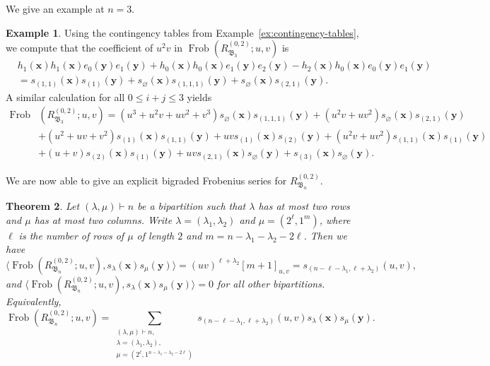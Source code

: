 \documentclass[12pt]{amsart}
\theoremstyle{plain}
\newtheorem{theorem}{Theorem}[section]
\theoremstyle{definition}
\newtheorem{example}[theorem]{Example}
\DeclareMathOperator{\Frob}{Frob}
\newcommand{\x}{\mathbf{x}}
\newcommand{\y}{\mathbf{y}}
\begin{document}
We give an example at $n=3$.
\begin{example}\label{ex:n3-frobenius}
    Using the contingency tables from Example~\ref{ex:contingency-tables}, we compute that the coefficient of $ u^2 v $ in $\Frob(R_{\mathfrak{B}_3}^{(0,2)}; u, v)$ is
    \begin{equation}
\begin{aligned}
        &h_1(\x)h_1(\x)e_0(\y)e_1(\y) + h_0(\x)h_0(\x)e_1(\y)e_2(\y) - h_2(\x)h_0(\x)e_0(\y)e_1(\y)\\
        &= s_{(1,1)}(\x)s_{(1)}(\y) + s_{\varnothing}(\x)s_{(1,1,1)}(\y) + s_{\varnothing}(\x)s_{(2,1)}(\y).
    \end{aligned}
\end{equation}
    A similar calculation for all $0 \leq i+j \leq 3$ yields 
        \begin{equation}
\begin{aligned}
        \Frob&(R_{\mathfrak{B}_3}^{(0,2)}; u, v) =
        (u^3+u^2v+uv^2+v^3)s_{\varnothing}(\x) s_{(1, 1, 1)}(\y) 
        + (u^2v+uv^2)s_{\varnothing}(\x) s_{(2, 1)}(\y)\\ 
        &+ (u^2+uv+v^2)s_{(1)}(\x) s_{(1, 1)}(\y)
        + uvs_{(1)}(\x) s_{(2)}(\y) 
        + (u^2v+uv^2)s_{(1,1)}(\x) s_{(1)}(\y)\\ 
        &+ (u+v)s_{(2)}(\x) s_{(1)}(\y) + uvs_{(2,1)}(\x) s_{\varnothing}(\y) + s_{(3)}(\x) s_{\varnothing}(\y).
    \end{aligned}
\end{equation}
\end{example}

We are now able to give an explicit bigraded Frobenius series for $R_{\mathfrak{B}_n}^{(0,2)}$.
\begin{theorem}\label{thm:explicit-0-2}
Let $(\lambda,\mu) \vdash n$ be a bipartition such that $\lambda$ has at most two rows and $\mu$ has at most two columns.
Write $\lambda = (\lambda_1,\lambda_2)$ and $\mu = (2^\ell, 1^m)$, where $\ell$ is the number of rows of $\mu$ of length $2$ and $m = n - \lambda_1 - \lambda_2 - 2\ell$.
Then we have
\begin{equation}
\langle \Frob(R_{\mathfrak{B}_n}^{(0,2)};u,v),s_{\lambda}(\x) s_{\mu}(\y) \rangle = (uv)^{\ell+\lambda_2} [m+1]_{u,v} = s_{(n-\ell-\lambda_1, \ell+\lambda_2)}(u,v),
\end{equation}
and $\langle \Frob(R_{\mathfrak{B}_n}^{(0,2)};u,v),s_{\lambda}(\x) s_{\mu}(\y) \rangle  = 0$ for all other bipartitions.
Equivalently,
\begin{equation}
    \Frob(R_{\mathfrak{B}_n}^{(0,2)};u,v) = \sum_{\substack{(\lambda, \mu)\vdash n,\\ \lambda = (\lambda_1,\lambda_2),\\ \mu = (2^\ell, 1^{n-\lambda_1-\lambda_2-2\ell}) }} s_{(n-\ell-\lambda_1, \ell+\lambda_2)}(u,v)s_{\lambda}(\x) s_{\mu}(\y).
\end{equation}
\end{theorem}
\end{document}
